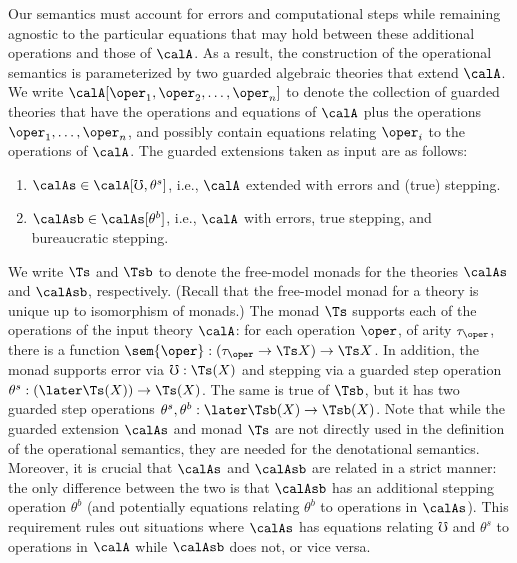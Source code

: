 \documentclass[acmsmall,screen,review,anonymous]{acmart}
\theoremstyle{remark}
\begin{document}
Our semantics must account for errors and computational steps while remaining
agnostic to the particular equations that may hold between these additional
operations and those of $\calA$. As a result, the construction of the
operational semantics is parameterized by two guarded algebraic theories that
extend $\calA$. We write $\calA[\oper_1, \oper_2, \dots, \oper_n]$ to denote the
collection of guarded theories that have the operations and equations of $\calA$
plus the operations $\oper_1, \dots, \oper_n$, and possibly contain equations
relating $\oper_i$ to the operations of $\calA$. The guarded extensions taken as
input are as follows:
%
\begin{enumerate}

  \item $\calAs \in \calA[\mho, \theta^s]$, i.e., $\calA$ extended with errors and
  (true) stepping.

  \item $\calAsb \in \calAs[\theta^b]$, i.e., $\calA$ with errors, true stepping,
  and bureaucratic stepping.
\end{enumerate}
%
We write $\Ts$ and $\Tsb$ to denote the free-model monads for the theories
$\calAs$ and $\calAsb$, respectively. (Recall that the free-model monad for a
theory is unique up to isomorphism of monads.)
%
The monad $\Ts$ supports each of the operations of the input theory $\calA$: for
each operation $\oper$, of arity $\tau_\oper$, there is a function $\sem{\oper}
: (\tau_\oper \to \Ts X) \to \Ts X$. In addition, the monad supports error via
$\mho : \Ts(X)$ and stepping via a guarded step operation $\theta^s : (\later
\Ts(X)) \to \Ts(X)$.
The same is true of $\Tsb$, but it has two guarded step operations
$\theta^s, \theta^b : \later \Tsb(X) \to \Tsb(X)$.
%
Note that while the guarded extension $\calAs$ and monad $\Ts$ are not directly
used in the definition of the operational semantics, they are needed for the
denotational semantics. Moreover, it is crucial that $\calAs$ and $\calAsb$ are
related in a strict manner: the only difference between the two is that
$\calAsb$ has an additional stepping operation $\theta^b$ (and potentially
equations relating $\theta^b$ to operations in $\calAs$). This requirement rules
out situations where $\calAs$ has equations relating $\mho$ and $\theta^s$ to
operations in $\calA$ while $\calAsb$ does not, or vice versa.

\end{document}
